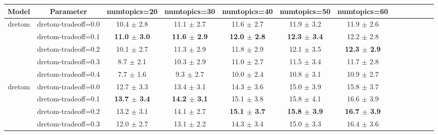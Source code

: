 \begin{table}
\begin{tabular}{ccccccccccccc}
    \textbf{Model} & \textbf{Parameter} &         \textbf{\gls{numtopics}=20} &        \textbf{\gls{numtopics}=30} &        \textbf{\gls{numtopics}=40} &        \textbf{\gls{numtopics}=50} &        \textbf{\gls{numtopics}=60} \\
    \midrule
    \multirow{5}{1.5cm}{\gls{dretom} \gensim{}} & \gls{dretom-tradeoff}=0.0 &            10.4 $\pm$ 2.8 &            11.1 $\pm$ 2.7 &            11.6 $\pm$ 2.7 &            11.9 $\pm$ 3.2 &            11.9 $\pm$ 2.6 \\
                                                                      & \gls{dretom-tradeoff}=0.1 &  \bfseries 11.0 $\pm$ 3.0 &  \bfseries 11.6 $\pm$ 2.9 &  \bfseries 12.0 $\pm$ 2.8 &  \bfseries 12.3 $\pm$ 3.4 &            12.2 $\pm$ 2.8 \\
                                                                      & \gls{dretom-tradeoff}=0.2 &            10.1 $\pm$ 2.7 &            11.3 $\pm$ 2.9 &            11.8 $\pm$ 2.9 &            12.1 $\pm$ 3.5 &  \bfseries 12.3 $\pm$ 2.9 \\
                                                                      & \gls{dretom-tradeoff}=0.3 &             8.7 $\pm$ 2.1 &            10.3 $\pm$ 2.9 &            11.0 $\pm$ 2.7 &            11.5 $\pm$ 3.4 &            11.7 $\pm$ 2.8 \\
                                                                      & \gls{dretom-tradeoff}=0.4 &             7.7 $\pm$ 1.6 &             9.3 $\pm$ 2.7 &            10.0 $\pm$ 2.4 &            10.8 $\pm$ 3.1 &            10.9 $\pm$ 2.7 \\
    \midrule
    \multirow{5}{1.5cm}{\gls{dretom} \mallet{}} & \gls{dretom-tradeoff}=0.0 &            12.7 $\pm$ 3.3 &            13.4 $\pm$ 3.1 &            14.3 $\pm$ 3.6 &            15.0 $\pm$ 3.9 &            15.8 $\pm$ 3.7 \\
                                                                      & \gls{dretom-tradeoff}=0.1 &  \bfseries 13.7 $\pm$ 3.4 &  \bfseries 14.2 $\pm$ 3.1 &            15.1 $\pm$ 3.8 &            15.8 $\pm$ 4.1 &            16.6 $\pm$ 3.9 \\
                                                                      & \gls{dretom-tradeoff}=0.2 &            13.2 $\pm$ 3.1 &            14.1 $\pm$ 2.7 &  \bfseries 15.1 $\pm$ 3.7 &  \bfseries 15.8 $\pm$ 3.9 &  \bfseries 16.7 $\pm$ 3.9 \\
                                                                      & \gls{dretom-tradeoff}=0.3 &            12.0 $\pm$ 2.7 &            13.1 $\pm$ 2.2 &            14.3 $\pm$ 3.4 &            15.0 $\pm$ 3.3 &            16.4 $\pm$ 3.6 \\

\end{tabular}
\end{table}

